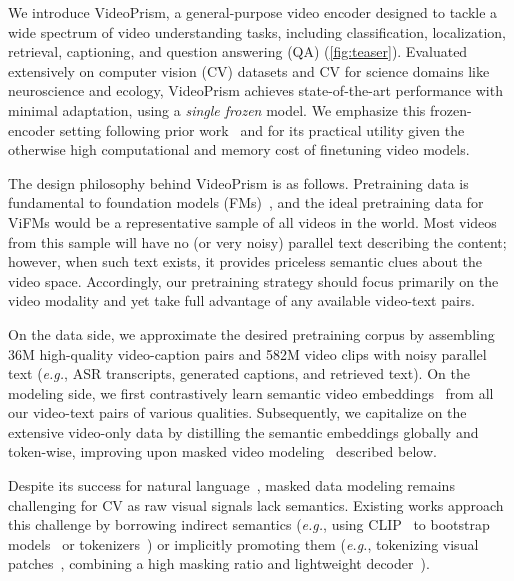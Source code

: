 \documentclass{article}
\theoremstyle{plain}
\theoremstyle{definition}
\theoremstyle{remark}
\newcommand{\OURS}{VideoPrism\xspace}
\newcommand{\eg}{\textit{e.g.}\xspace}
\begin{document}
We introduce \OURS, a general-purpose video encoder designed to tackle  a wide spectrum of video understanding tasks, including classification, localization, retrieval, captioning, and question answering (QA) (\cref{fig:teaser}). Evaluated extensively on computer vision (CV) datasets and CV for science domains like neuroscience and ecology, \OURS achieves state-of-the-art performance with minimal adaptation, using a \textit{single frozen} model. We emphasize this frozen-encoder setting following prior work~\cite{radford2021learning,alayrac2022flamingo,tang2023video,li2023blip} and for its practical utility given the otherwise high computational and memory cost of finetuning video models. 













The design philosophy behind \OURS is as follows. Pretraining data is fundamental to foundation models (FMs)~\cite{bommasani2021opportunities}, and the ideal pretraining data for ViFMs would be a representative sample of all videos in the world. Most videos from this  sample will have no (or very noisy) parallel text describing the content; however, when such text exists, it provides priceless semantic clues about the video space. Accordingly, our pretraining strategy should focus primarily on the video modality and yet take full advantage of any available video-text pairs.


On the data side, we approximate the desired  pretraining corpus by assembling 36M high-quality video-caption pairs and 582M video clips with noisy parallel text (\eg, ASR transcripts, generated captions, and retrieved text). On the modeling side, we first contrastively learn semantic video embeddings~\cite{radford2021learning,jia2021scaling} from all our video-text pairs of various qualities. Subsequently, we capitalize on the extensive video-only data by distilling the semantic embeddings globally and token-wise, improving upon masked video modeling~\cite{tong2022videomae,feichtenhofer2022masked,wang2023masked} described below.


Despite its success for natural language~\cite{devlin2019bert,brown2020language,anil2023palm}, masked data modeling remains challenging for CV as raw visual signals lack semantics. Existing works approach this challenge by borrowing {indirect} semantics (\eg, using CLIP~\cite{radford2021learning} to bootstrap models~\cite{fang2022eva,fang2023eva} or tokenizers~\cite{peng2022beit}) or {implicitly} promoting them (\eg, tokenizing visual patches~\cite{zhou2022ibot,bao2022beit,oquab2023dinov2}, combining a high masking ratio and  lightweight decoder~\cite{he2022masked}). 
\end{document}
